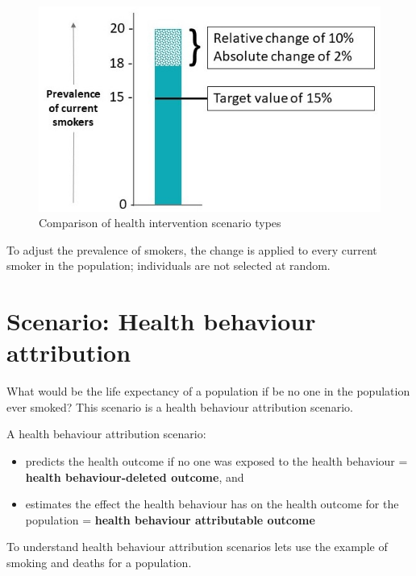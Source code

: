 \documentclass[]{book}
\begin{document}
\begin{figure}

{\centering \includegraphics{Images/Scenario-Abs, Rel, Target cropped} 

}

\caption{Comparison of health intervention scenario types}\label{fig:unnamed-chunk-48}
\end{figure}

To adjust the prevalence of smokers, the change is applied to every
current smoker in the population; individuals are not selected at
random.

\section{Scenario: Health behaviour
attribution}\label{scenario-health-behaviour-attribution}

What would be the life expectancy of a population if be no one in the
population ever smoked? This scenario is a health behaviour attribution
scenario.

A health behaviour attribution scenario:

\begin{itemize}
\item
  predicts the health outcome if no one was exposed to the health
  behaviour = \textbf{health behaviour-deleted outcome}, and
\item
  estimates the effect the health behaviour has on the health outcome
  for the population = \textbf{health behaviour attributable outcome}
\end{itemize}

To understand health behaviour attribution scenarios lets use the
example of smoking and deaths for a population.
\end{document}
